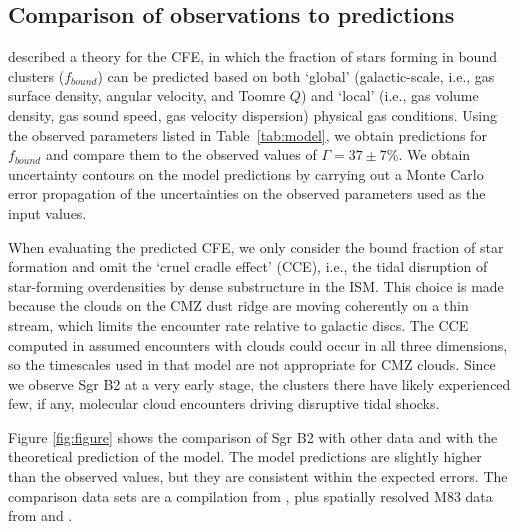 \documentclass[twocolumn]{aastex62}
\begin{document}
\subsection{Comparison of observations to predictions}
\citet{Kruijssen2012a} described a theory for the CFE, in which the fraction
of stars forming in bound clusters ($f_{bound}$) can be predicted based on both
`global' (galactic-scale, i.e., gas surface density, angular velocity, and
Toomre $Q$) and `local' (i.e., gas volume density, gas sound speed, gas
velocity dispersion) physical gas conditions. Using the observed parameters
listed in Table~\ref{tab:model}, we obtain predictions for $f_{bound}$ and
compare them to the observed values of $\Gamma=37\pm7\%$. We obtain uncertainty
contours on the model predictions by carrying out a Monte Carlo error
propagation of the uncertainties on the observed parameters used as the input
values.

When evaluating the predicted CFE, we only consider the bound fraction of star formation
and omit the `cruel cradle effect' (CCE), i.e., the tidal disruption of
star-forming overdensities by dense substructure in the ISM. This choice is
made because the clouds on the CMZ dust ridge are moving coherently on a thin
stream, which limits the encounter rate relative to galactic discs.  The CCE
computed in \citet{Kruijssen2012a} assumed encounters with clouds could occur
in all three dimensions, so the timescales used in that model are not
appropriate for CMZ clouds.  Since we observe Sgr B2 at a very early stage, the
clusters there have likely experienced few, if any, molecular cloud encounters
driving disruptive tidal shocks.

Figure \ref{fig:figure} shows the comparison of Sgr B2 with other data and with
the theoretical prediction of the \citet{Kruijssen2012a} model. The model predictions are
slightly higher than the observed values, but they are consistent within the
expected errors. The comparison data sets are a compilation from
\citet{Adamo2015a}, plus spatially resolved M83 data from \citet{Freeman2017a}
and \citet{Adamo2015a}.
\end{document}

